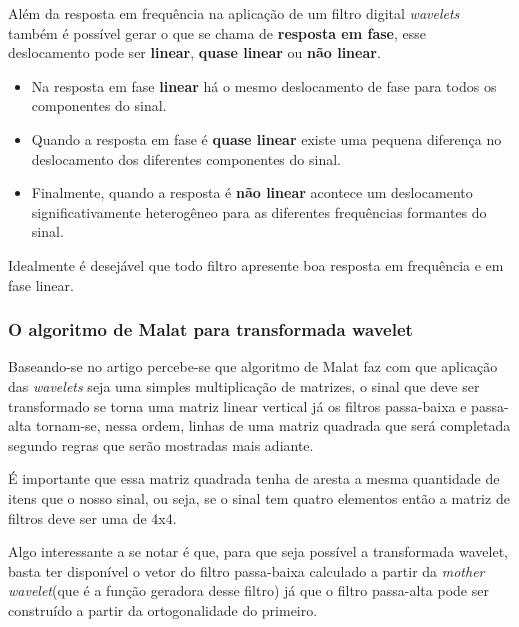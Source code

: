 			\par Além da resposta em frequência na aplicação de um filtro digital \textit{wavelets} também é possível gerar o que se chama de \textbf{resposta em fase}, esse deslocamento pode ser \textbf{linear}, \textbf{quase linear} ou \textbf{não linear}. 
			
			\begin{itemize}
				\item Na resposta em fase \textbf{linear} há o mesmo deslocamento de fase para todos os componentes do sinal.
				\item Quando a resposta em fase é \textbf{quase linear} existe uma pequena diferença no deslocamento dos diferentes componentes do sinal.
				\item Finalmente, quando a resposta é \textbf{não linear} acontece um deslocamento significativamente heterogêneo para as diferentes frequências formantes do sinal.
				\end{itemize}
			
			\par Idealmente é desejável que todo filtro apresente boa resposta em frequência e em fase linear.
			
			

		\subsubsection{O algoritmo de Malat para transformada wavelet}
			\par Baseando-se no artigo \cite{7079589} percebe-se que algoritmo de Malat faz com que aplicação das \textit{wavelets} seja uma simples multiplicação de matrizes, o sinal que deve ser transformado se torna uma matriz linear vertical já os filtros passa-baixa e passa-alta tornam-se, nessa ordem, linhas de uma matriz quadrada que será completada segundo regras que serão mostradas mais adiante.
			\par É importante que essa matriz quadrada tenha de aresta a mesma quantidade de itens que o nosso sinal, ou seja, se o sinal tem quatro elementos então a matriz de filtros deve ser uma de 4x4.
			\par Algo interessante a se notar é que, para que seja possível a transformada wavelet, basta ter disponível o vetor do filtro passa-baixa calculado a partir da \textit{mother wavelet}(que é a função geradora desse filtro) já que o filtro passa-alta pode ser construído a partir da ortogonalidade do primeiro.
			
